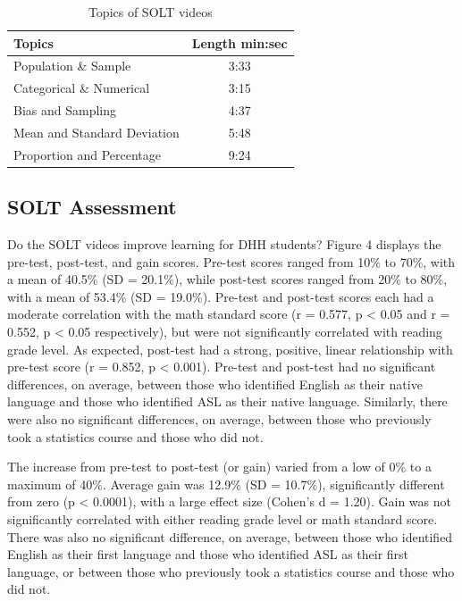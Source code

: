 \documentclass[11.5pt]{sig-alternate} %
\begin{document}
\begin{large}
\begin{table}[ht]
\caption{Topics of SOLT videos}
\begin{tabular}{|l|c|}
\hline
\textbf{Topics} & \textbf{Length {min:sec}} \\ \hline
Population \& Sample & 3:33 \\ \hline
Categorical \& Numerical & 3:15 \\ \hline
Bias and Sampling & 4:37 \\ \hline
Mean and Standard Deviation & 5:48 \\ \hline
Proportion and Percentage & 9:24 \\ \hline
\end{tabular}
\end{table}

\subsection*{SOLT Assessment}

Do the SOLT videos improve learning for DHH students? Figure 4 displays the pre-test, post-test, and gain scores. Pre-test scores ranged from 10\% to 70\%, with a mean of 40.5\% (SD = 20.1\%), while post-test scores ranged from 20\% to 80\%, with a mean of 53.4\% (SD = 19.0\%). Pre-test and post-test scores each had a moderate correlation with the math standard score (r = 0.577, p < 0.05 and r = 0.552, p < 0.05 respectively), but were not significantly correlated with reading grade level. As expected, post-test had a strong, positive, linear relationship with pre-test score (r = 0.852, p < 0.001). Pre-test and post-test had no significant differences, on average, between those who identified English as their native language and those who identified ASL as their native language. Similarly, there were also no significant differences, on average, between those who previously took a statistics course and those who did not.

The increase from pre-test to post-test (or gain) varied from a low of 0\% to a maximum of 40\%. Average gain was 12.9\% (SD = 10.7\%), significantly different from zero (p < 0.0001), with a large effect size (Cohen's d = 1.20). Gain was not significantly correlated with either reading grade level or math standard score. There was also no significant difference, on average, between those who identified English as their first language and those who identified ASL as their first language, or between those who previously took a statistics course and those who did not.


\end{large}
\end{document}
